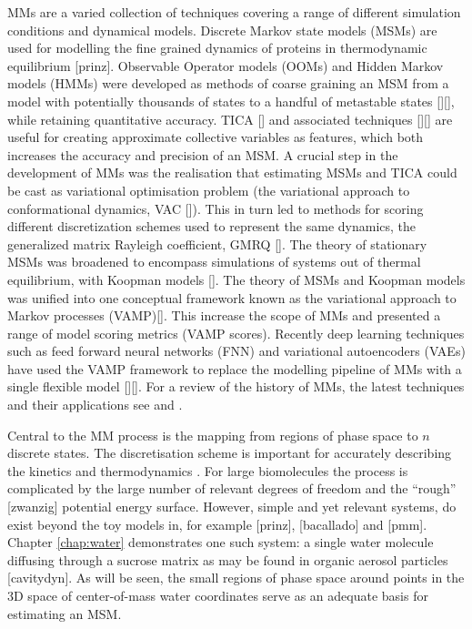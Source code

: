 MMs are a varied collection of techniques covering a range of different simulation conditions and dynamical models. Discrete Markov state models (MSMs) are used for modelling the fine grained dynamics of proteins in thermodynamic equilibrium [prinz].  Observable Operator models (OOMs) and Hidden Markov models (HMMs) were developed as methods of coarse graining an MSM from a model with potentially thousands of states to a handful of metastable states [][], while retaining quantitative accuracy.   TICA [] and associated techniques [][] are useful for creating approximate collective variables as features, which both increases the accuracy and precision of an MSM. A crucial step in the development of MMs was the realisation that estimating MSMs and TICA could be cast as variational optimisation problem (the variational approach to conformational dynamics, VAC []). This in turn led to methods for scoring different discretization schemes used to represent the same dynamics, the generalized matrix Rayleigh coefficient, GMRQ []. The theory of stationary MSMs was broadened to encompass simulations of systems out of thermal equilibrium, with Koopman models []. The theory of MSMs and Koopman models was unified into one conceptual framework known as the variational approach to Markov processes (VAMP)[]. This increase the scope of MMs and presented a range of model scoring metrics (VAMP scores). Recently deep learning techniques such as feed forward neural networks (FNN) and variational autoencoders (VAEs) have used the VAMP framework to replace the modelling pipeline of MMs with a single flexible model [][]. For a review of the history of MMs, the latest techniques and their applications see \cite{husicMarkovStateModels2018} and \cite{noeMarkovModelsMolecular2019b}. 

Central to the MM process is the mapping from regions of phase space to $n$ discrete states. The discretisation scheme is important for accurately describing the kinetics and thermodynamics \cite{shallowayMacrostatesClassicalStochastic1996}. For large biomolecules the process is complicated by the large number of relevant degrees of freedom \cite{shallowayMacrostatesClassicalStochastic1996} and the ``rough'' [zwanzig] potential energy surface. However, simple and yet relevant systems, do exist beyond the toy models in, for example [prinz], [bacallado] and [pmm]. Chapter \ref{chap:water} demonstrates one such system: a single water molecule diffusing through a sucrose matrix as may be found in organic aerosol particles [cavitydyn]. As will be seen, the small regions of phase space around points in the 3D space of center-of-mass water coordinates serve as an adequate basis for estimating an MSM. 


